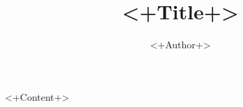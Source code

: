 \documentclass[a4paper,11pt,english]{article}
\title{<+Title+>}
\author{<+Author+>}
\begin{document}
\maketitle
<+Content+>
\end{document}
